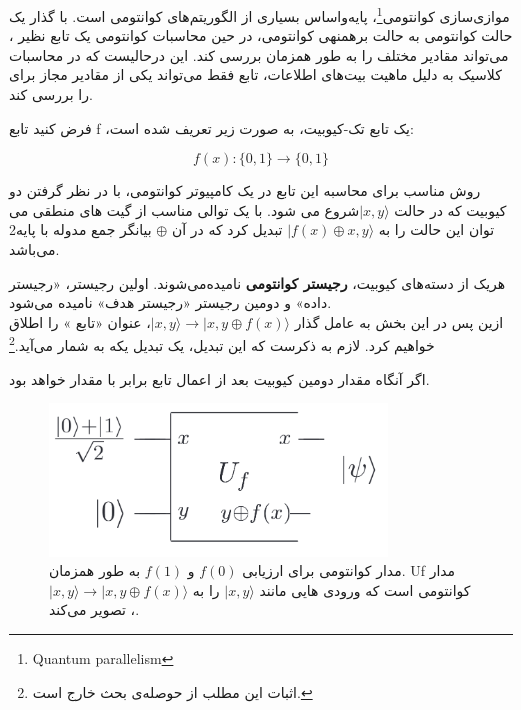 \documentclass{book}
\begin{document}
موازی‌سازی کوانتومی\footnote{Quantum parallelism}، پایه‌واساس بسیاری از الگوریتم‌های کوانتومی است. با گذار یک حالت کوانتومی به حالت برهمنهی کوانتومی، در حین محاسبات کوانتومی یک تابع نظیر ، می‌تواند مقادیر مختلف  را به طور همزمان بررسی کند. این درحالیست که در محاسبات کلاسیک به دلیل ماهیت بیت‌های اطلاعات، تابع  فقط می‌تواند یکی از مقادیر مجاز برای  را بررسی کند.


فرض کنید تابع f ،یک تابع تک-کیوبیت، به صورت زیر تعریف شده است:\\
\begin{center}
\begin{equation}
f (x) : \{0, 1\} \rightarrow \{0, 1\}
\end{equation}
\end{center}

روش مناسب برای محاسبه این تابع در یک کامپیوتر کوانتومی، با در نظر گرفتن دو کیوبیت که در حالت $\vert x, y\rangle$شروع می شود. با یک توالی مناسب از گیت های منطقی می توان این حالت را به $\vert f(x) \oplus x, y\rangle$ تبدیل کرد که در آن $\oplus$ بیانگر جمع مدوله با پایه‌2 می‌باشد.

هریک از دسته‌های کیوبیت، \textbf{رجیستر کوانتومی} نامیده‌می‌شوند. اولین رجیستر، «رجیستر داده» و دومین رجیستر «رجیستر هدف» نامیده می‌شود.\\
ازین پس در این بخش به عامل گذار $\vert x, y \rangle \rightarrow \vert x, y \oplus f(x) \rangle$، عنوان «تابع » را اطلاق خواهیم کرد. لازم به ذکرست که این تبدیل، یک تبدیل یکه به شمار می‌آید.\footnote{اثبات این مطلب از حوصله‌ی بحث خارج است.}


اگر  آنگاه مقدار دومین کیوبیت بعد از اعمال تابع  برابر با مقدار  خواهد بود.

 \begin{center}
 	 \begin{figure}[h]
 		\centering
 		\includegraphics[width=0.8\textwidth]{Uforacle.png}
 		\caption{مدار کوانتومی برای ارزیابی $f (0)$ و $f (1)$ به طور همزمان. Uf مدار کوانتومی است که ورودی هایی مانند $\vert x, y\rangle$ را به $\vert x, y \rangle \rightarrow \vert x, y \oplus f(x) \rangle$، تصویر می‌کند.}
 	\end{figure}
 \end{center}
\end{document}
